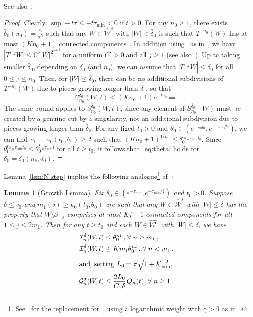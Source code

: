 \documentclass[10pt]{amsart}
\newtheorem{lemm}[theo]{Lemma}\newtheorem{prop}[theo]{Proposition}\newtheorem{coro}[theo]{Corollary}\newtheorem{conj}[theo]{Conjecture}
\theoremstyle{definition}\newtheorem{defi}[theo]{Definition}\newtheorem{rema}[theo]{Remark}\newtheorem{exam}[theo]{Example}\newtheorem{exem}[theo]{Example}\newtheorem{nota}[theo]{Notation}
\newcommand{\cG}{\mathcal{G}}
\newcommand{\cI}{\mathcal{I}}
\newcommand{\cK}{\mathcal{K}}
\newcommand{\cS}{\mathcal{S}}
\newcommand{\cW}{\mathcal{W}}
\newcommand{\hW}{\widehat{\cW}}
\newcommand*{\MK}{\mkern 2mu}
\let\oldforall\forall
\renewcommand*{\forall}{\mathrel{\oldforall}}
\begin{document}
See also~\cite[Lemma~3.1$\MK$(a)]{Ca}.

\begin{proof}
Clearly,
$\sup -t\tau \le -t \tau_{\min}<0$ if $t>0$. For any $n_0\ge 1$, there exists $\bar \delta_0(n_0)=\frac{\delta_0}{2^N}$ such that any $W\in \hW^s$ with $|W|<\bar \delta_0$ is such that $T^{-n_0}(W)$ has at most $(Kn_0+1)$ connected components~\cite[Lemma~5.2]{Ch}. In addition using~\cite[Ex.~4.50]{CM} as in~\cite[Proof of Lemma~5.1]{BD1}, we have $|T^{-j}W|\le C' |W|^{2^{-s_0 j}}$ for a uniform $C'>0$ and all $j\ge 1$ (see also~\cite[Lemma~3.1]{Ca}). Up to taking smaller $\bar \delta_0$, depending on $\delta_0$ (and $n_0$), we can assume that $|T^{-j}W|\le \delta_0$ for all $0\le j\le n_0$. Then, for $|W|\le \bar \delta_0$, there can be no additional subdivisions of $T^{-n_0}(W)$ due to pieces growing longer than $\delta_0$, so that
\begin{equation}\label{complexity step}
\cG_{n_0}^{ \delta_0}(W,t)
\le (K n_0+1) e^{-tn_0 \tau_{\min}} \,.
\end{equation}
The same bound applies to $S_{n_0}^{\bar \delta_0}(W,t)$, since any element of $S_{n_0}^{\bar \delta_0}(W)$ must be created by a genuine cut by a singularity, not an additional subdivision due to pieces growing longer than $\bar \delta_0$. For any fixed $t_0>0$ and $\theta_0\in (e^{- \tau_{\min}},e^{- \tau_{\min}/2})$, we can find $n_0=n_0(t_0, \theta_0)\ge 2$ such that $(Kn_0+1)^{1/n_0} \le \theta_0^{t_0} e^{\tau_{\min} t_0}$. Since $ \theta_0^{t_0} e^{\tau_{\min} t_0}\le \theta_0^{t} e^{\tau_{\min} t}$ for all $t\ge t_0$, it follows that~\eqref{eq:theta} holds for $\bar \delta_0=\bar \delta_0(n_0,\delta_0)$.
\end{proof}

Lemma~\ref{lem:N step} implies the following analogue\footnote{See~\cite[Lemma~3.1$\MK$(b)]{Ca} for the replacement for~\cite[Lemmas~3.3--3.4, $\zeta\ne 0$]{BD2}, using a logarithmic weight with $\gamma>0$ as in~\cite{BD1}.} of~\cite[Lemmas~3.3--3.4, $\zeta=0$]{BD2}:

\begin{lemm}[Growth Lemma]\label{lem:short growth}
Fix $\theta_0\in (e^{- \tau_{\min}}, e^{-\tau_{\min}/2})$ and $t_0 > 0$. Suppose $\delta \le \delta_0$ and $m_1(\delta) \ge n_0(t_0, \theta_0)$ are such that any $W \in \hW^s$ with $|W| \le \delta$ has the property that $W \setminus \cS_{-j}$ comprises at most $Kj + 1$ connected components for all $1 \le j \le 2m_1$. Then for any $t \ge t_0$ and each $W \in \hW^s$ with $|W| \le \delta$, we have
\begin{align}
\cI^{\delta}_n(W,t)
&\le \theta_0^{nt} \,, \, \forall n\ge m_1\,,
\label{eq:short growth up}
\\
\cI^{\delta}_n(W,t)
&\le Km_1 \theta_0^{nt} \,, \, \forall n < m_1\,,\label{eq:short growth up small n}
\\
\intertext{and, setting $L_0 = \pi \sqrt{1 + \cK_{\min}^{-2}}$,}
\cG^{\delta}_n(W,t) &\le \frac{2 L_0 }{C_1 \delta}\, Q_n(t) \,, \forall n\ge 1 \,.\label{eq:extra growth up}
\end{align}
\end{lemm}
\end{document}
